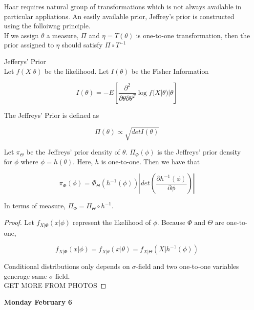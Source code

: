 \documentclass[11pt,fleqn]{book} %
\begin{document}
Haar requires natural group of transformations which is not always available in particular appliations. An easily available prior, Jeffrey's prior is constructed using the folloiwng principle. \\

If we assign $\theta$ a measure, $\Pi$ and $\eta = T(\theta)$ is one-to-one transformation, then the prior assigned to $\eta$ should satisfy $\Pi \circ T^{-1}$

Jefferys' Prior\\

Let $f(X|\theta)$ be the likelihood. Let $I(\theta)$ be the Fisher Information

		$$I(\theta) = - E\left[\frac{\partial^2}{\partial\theta \partial \theta^T} \log f(X|\theta) |\theta \right] $$ 

The Jeffreys' Prior is defined as 

		$$\Pi(\theta) \propto \sqrt{det I(\theta)} $$

\begin{theorem}[1.16]
	Let $\pi_\Theta$ be the Jeffreys' prior density of $\theta$. $\Pi_\Phi(\phi)$ is the Jeffreys' prior density for $\phi$ where $\phi = h(\theta)$. Here, $h$ is one-to-one. Then we have that

			$$\pi_\Phi(\phi) = \Phi_\Theta(h^{-1}(\phi)) \left| det\left(\frac{\partial h^{-1} (\phi)}{\partial \phi}\right) \right| $$

	In terms of measure, $\Pi_\Phi = \Pi_\Theta \circ h^{-1}$.
\end{theorem}

\begin{proof}
	Let $f_{X|\Phi}(x|\phi)$ represent the likelihood of $\phi$. Because $\Phi$ and $\Theta$ are one-to-one, 

			$$f_{X|\Phi}(x|\phi) = f_{X|\theta}(x| \theta) = f_{X|\Theta}(X |h^{-1}(\phi)) $$

	Conditional distributions only depends on $\sigma$-field and two one-to-one variables generage same $\sigma$-field. \\

	GET MORE FROM PHOTOS
\end{proof}

\textbf{Monday February 6}\\
\end{document}
